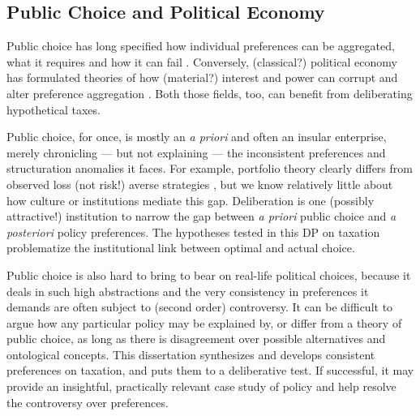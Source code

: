 
\subsection{Public Choice and Political Economy}
Public choice has long specified how individual preferences can be aggregated, what it requires and how it can fail \citep[for an overview,][]{Mueller}.
Conversely, (classical?) political economy has formulated theories of how (material?) interest and power can corrupt and alter preference aggregation \citep[for an overview,][]{Robbins1976}.
Both those fields, too, can benefit from deliberating hypothetical taxes.

Public choice, for once, is mostly an \emph{a priori} and often an insular enterprise, merely chronicling --- but not explaining --- the inconsistent preferences and structuration anomalies it faces. 
For example, portfolio theory clearly differs from observed loss (not risk!) averse strategies \cite{Kahneman2011}, but we know relatively little about how culture or institutions mediate this gap.
Deliberation is one (possibly attractive!) institution to narrow the gap between \emph{a priori} public choice and \emph{a posteriori} policy preferences. 
The hypotheses tested in this \gls{DP} on taxation problematize the institutional link between optimal and actual choice.

Public choice is also hard to bring to bear on real-life political choices, because it deals in such high abstractions and the very consistency in preferences it demands are often subject to (second order) controversy.
It can be difficult to argue how any particular policy may be explained by, or differ from a theory of public choice, as long as there is disagreement over possible alternatives and ontological concepts.
This dissertation synthesizes and develops consistent preferences on taxation, and puts them to a deliberative test.
If successful, it may provide an insightful, practically relevant case study of policy and help resolve the controversy over preferences.

